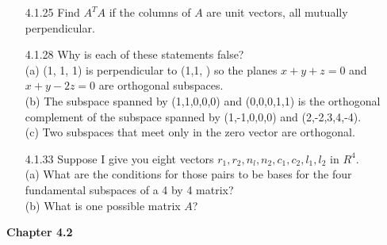 \documentclass[10pt,twoside,reqno]{article}
\begin{document}
\begin{enumerate}
\vspace{3mm}
\item[4.1.25] Find $A^T A$ if the columns of $A$ are unit vectors, all mutually perpendicular. \\
\vspace{3mm}

\vspace{3mm}
\item[4.1.28] Why is each of these statements false? \\
{\addtolength{\leftskip}{5mm}
(a) (1, 1, 1) is perpendicular to (1,1, ) so the planes $x + y + z = 0$ and $x + y - 2z = 0$ are orthogonal subspaces. \\
(b) The subspace spanned by (1,1,0,0,0) and (0,0,0,1,1) is the orthogonal complement of the subspace spanned by (1,-1,0,0,0) and (2,-2,3,4,-4). \\
(c) Two subspaces that meet only in the zero vector are orthogonal. \\
}
\vspace{3mm}

\vspace{3mm}
\item[4.1.33] Suppose I give you eight vectors $r_1, r_2, n_l, n_2, c_1, c_2, l_1,l_2$ in $R^4$. \\
{\addtolength{\leftskip}{5mm}
(a) What are the conditions for those pairs to be bases for the four fundamental subspaces of a 4 by 4 matrix? \\
(b) What is one possible matrix $A$? \\
}
\vspace{3mm}

\vspace{3mm}
\end{enumerate}
\vspace{5mm}
\textbf{Chapter 4.2}
\end{document}
